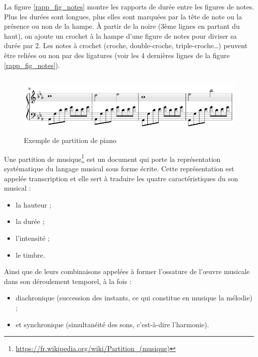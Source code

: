 La figure \ref{rapp_fig_notes} montre les rapports de durée entre les figures de notes. Plus les durées sont longues, plus elles sont marquées par la tête de note ou la présence ou non de la hampe. À partir de la noire (3ème lignes en partant du haut), on ajoute un crochet à la hampe d’une figure de notes pour diviser sa durée par 2. 
Les notes à crochet (croche, double-croche, triple-croche…) 
peuvent être reliées ou non par des ligatures (voir les 4 dernières lignes de la figure \ref{rapp_fig_notes}).


\begin{figure}[h!]
	\centering
	\includegraphics[height=30mm, width=120mm]{z_images/1_contexte/5_partition_piano.png}
	\caption{Exemple de partition de piano}
\end{figure}

Une partition de musique\footnote{\url{https://fr.wikipedia.org/wiki/Partition\_(musique)}} est un document qui porte la représentation systématique du langage musical sous forme écrite. Cette représentation est appelée transcription et elle sert à traduire les quatre caractéristiques du son musical :
\begin{itemize}
	\item la hauteur ;
	\item la durée ;
	\item l’intensité ;
	\item le timbre.
\end{itemize}

Ainsi que de leurs combinaisons appelées à former l’ossature de l’œuvre musicale dans son déroulement temporel, à la fois :
\begin{itemize}
	\item diachronique (succession des instants, ce qui constitue en musique la mélodie) ;
	\item et synchronique (simultanéité des sons, c’est-à-dire l’harmonie).
\end{itemize}

